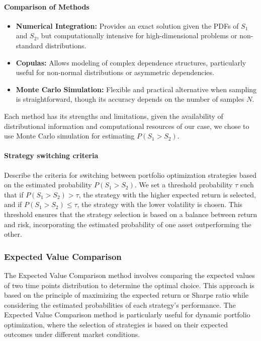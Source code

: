 \paragraph{Comparison of Methods}

\begin{itemize}
    \item \textbf{Numerical Integration:} Provides an exact solution given the PDFs of $S_1$ and $S_2$, but computationally intensive for high-dimensional problems or non-standard distributions.
    \item \textbf{Copulas:} Allows modeling of complex dependence structures, particularly useful for non-normal distributions or asymmetric dependencies.
    \item \textbf{Monte Carlo Simulation:} Flexible and practical alternative when sampling is straightforward, though its accuracy depends on the number of samples $N$.
\end{itemize}

Each method has its strengths and limitations, given the availability of distributional information and computational resources of our case, we chose to use Monte Carlo simulation for estimating $P(S_1 > S_2)$.


\paragraph{Strategy switching criteria}
Describe the criteria for switching between portfolio optimization strategies based on the estimated probability $P(S_1 > S_2)$.
We set a threshold probability $\tau$ such that if $P(S_1 > S_2) > \tau$, the strategy with the higher expected return is selected, and if $P(S_1 > S_2) \leq \tau$, the strategy with the lower volatility is chosen. This threshold ensures that the strategy selection is based on a balance between return and risk, incorporating the estimated probability of one asset outperforming the other.
\subsubsection{Expected Value Comparison}
The Expected Value Comparison method involves comparing the expected values of two time points distribution to determine the optimal choice. This approach is based on the principle of maximizing the expected return or Sharpe ratio while considering the estimated probabilities of each strategy's performance. The Expected Value Comparison method is particularly useful for dynamic portfolio optimization, where the selection of strategies is based on their expected outcomes under different market conditions.

